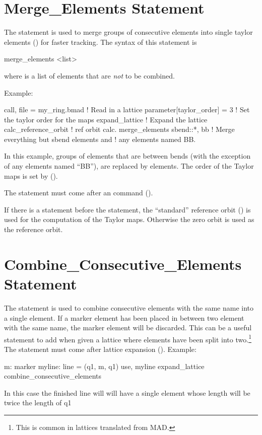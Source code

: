 {{{{{\section{Merge_Elements Statement}
\label{s:merge.eles}

The  statement is used to merge groups of consecutive elements into single
taylor elements () for faster tracking. The syntax of this statement is
\begin{example}
  merge_elements <list>
\end{example}
where  is a list of elements that are {\em not} to be combined.

Example:
\begin{example}
  call, file = my_ring.bmad     ! Read in a lattice
  parameter[taylor_order] = 3   ! Set the taylor order for the maps
  expand_lattice                ! Expand the lattice
  calc_reference_orbit          ! ref orbit calc.
  merge_elements sbend::*, bb ! Merge everything but sbend elements and 
                                !   any elements named BB.
\end{example}
In this example, groups of elements that are between bends (with the exception of any elements named
``BB''), are replaced by  elements. The order of the Taylor maps is set by
 ().

The  statement must come after an  command
().

If there is a  statement before the  statement, the
``standard'' reference orbit () is used for the computation of the Taylor
maps. Otherwise the zero orbit is used as the reference orbit.

\section{Combine_Consecutive_Elements Statement}
\label{s:merge.ele}

The  statement is used to combine consecutive elements with the same name into a
single element. If a marker element has been placed in between two element with the same name, the
marker element will be discarded. This can be a useful statement to add when given a lattice where
elements have been split into two.\footnote
  {
This is common in lattices translated from MAD.
  }
The  statement must come after lattice expansion (). Example:
\begin{example}
  m: marker
  myline: line = (q1, m, q1)
  use, myline
  expand_lattice
  combine_consecutive_elements
\end{example}
In this case the finished line will will have a single  element whose length will be twice the length of q1

}}}}}
